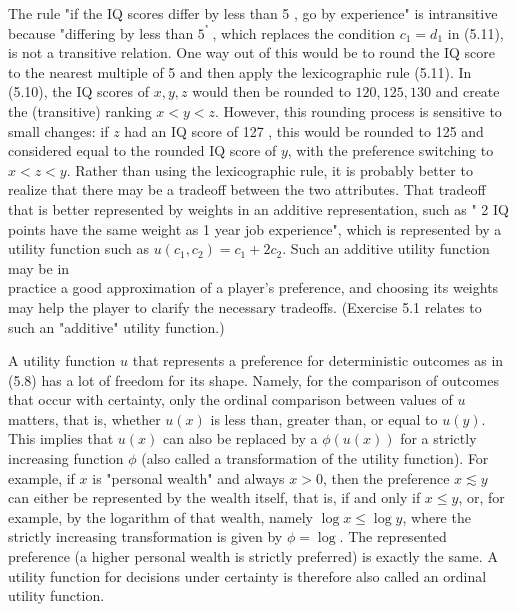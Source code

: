 \documentclass[12pt]{article}
\begin{document}
The rule "if the IQ scores differ by less than 5 , go by experience" is intransitive because "differing by less than $5^{\text {" }}$, which replaces the condition $c_{1}=d_{1}$ in (5.11), is not a transitive relation. One way out of this would be to round the IQ score to the nearest multiple of 5 and then apply the lexicographic rule (5.11). In (5.10), the IQ scores of $x, y, z$ would then be rounded to $120,125,130$ and create the (transitive) ranking $x<y<z$. However, this rounding process is sensitive to small changes: if $z$ had an IQ score of 127 , this would be rounded to 125 and considered equal to the rounded IQ score of $y$, with the preference switching to $x<z<y$. Rather than using the lexicographic rule, it is probably better to realize that there may be a tradeoff between the two attributes. That tradeoff that is better represented by weights in an additive representation, such as " 2 IQ points have the same weight as 1 year job experience", which is represented by a utility function such as $u\left(c_{1}, c_{2}\right)=c_{1}+2 c_{2}$. Such an additive utility function may be in\\
practice a good approximation of a player's preference, and choosing its weights may help the player to clarify the necessary tradeoffs. (Exercise 5.1 relates to such an "additive" utility function.)

A utility function $u$ that represents a preference for deterministic outcomes as in (5.8) has a lot of freedom for its shape. Namely, for the comparison of outcomes that occur with certainty, only the ordinal comparison between values of $u$ matters, that is, whether $u(x)$ is less than, greater than, or equal to $u(y)$. This implies that $u(x)$ can also be replaced by a $\phi(u(x))$ for a strictly increasing function $\phi$ (also called a transformation of the utility function). For example, if $x$ is "personal wealth" and always $x>0$, then the preference $x \lesssim y$ can either be represented by the wealth itself, that is, if and only if $x \leq y$, or, for example, by the logarithm of that wealth, namely $\log x \leq \log y$, where the strictly increasing transformation is given by $\phi=\log$. The represented preference (a higher personal wealth is strictly preferred) is exactly the same. A utility function for decisions under certainty is therefore also called an ordinal utility function.
\end{document}
